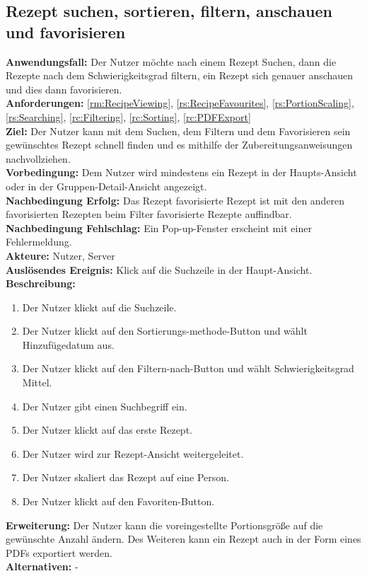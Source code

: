 \documentclass[parskip=full]{scrartcl}
\begin{document}
\subsection{Rezept suchen, sortieren, filtern, anschauen und favorisieren}
\textbf{Anwendungsfall:} Der Nutzer möchte nach einem Rezept Suchen, dann die Rezepte nach dem Schwierigkeitsgrad filtern, ein Rezept sich genauer anschauen und dies dann favorisieren.\\
\textbf{Anforderungen:} \ref{rm:RecipeViewing}, \ref{rs:RecipeFavourites}, \ref{rs:PortionScaling}, \ref{rs:Searching}, \ref{rc:Filtering}, \ref{rc:Sorting}, \ref{rc:PDFExport}\\
\textbf{Ziel:} Der Nutzer kann mit dem Suchen, dem Filtern und dem Favorisieren sein gewünschtes Rezept schnell finden und es mithilfe der Zubereitungsanweisungen nachvollziehen.\\
\textbf{Vorbedingung:} Dem Nutzer wird mindestens ein Rezept in der Haupts-Ansicht oder in der Gruppen-Detail-Ansicht angezeigt.\\
\textbf{Nachbedingung Erfolg:} Das Rezept favorisierte Rezept ist mit den anderen favorisierten Rezepten beim Filter favorisierte Rezepte auffindbar.\\
\textbf{Nachbedingung Fehlschlag:} Ein Pop-up-Fenster erscheint mit einer Fehlermeldung.\\
\textbf{Akteure:} Nutzer, Server\\
\textbf{Auslösendes Ereignis:} Klick auf die Suchzeile in der Haupt-Ansicht.\\
\textbf{Beschreibung:}
\begin{enumerate}
    \item Der Nutzer klickt auf die Suchzeile.
    \item Der Nutzer klickt auf den Sortierungs-methode-Button und wählt Hinzufügedatum aus.
    \item Der Nutzer klickt auf den Filtern-nach-Button und wählt Schwierigkeitsgrad Mittel.
    \item Der Nutzer gibt einen Suchbegriff ein.
    \item Der Nutzer klickt auf das erste Rezept.
    \item Der Nutzer wird zur Rezept-Ansicht weitergeleitet.
    \item Der Nutzer skaliert das Rezept auf eine Person.
    \item Der Nutzer klickt auf den Favoriten-Button.
\end{enumerate}
\textbf{Erweiterung:} Der Nutzer kann die voreingestellte Portionsgröße auf die gewünschte Anzahl ändern. Des Weiteren kann ein Rezept auch in der Form eines PDFs exportiert werden.\\
\textbf{Alternativen:} -
\newpage
\end{document}
